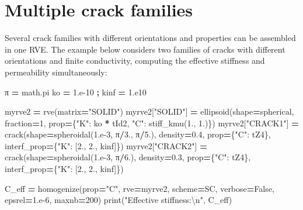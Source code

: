 \documentclass[
  a4paper,
  numbers=noendperiod,
  DIV=12]{scrreprt}
\newenvironment{Shaded}{\begin{snugshade}}{\end{snugshade}}
\newcommand{\BuiltInTok}[1]{#1}
\newcommand{\CharTok}[1]{\textcolor[rgb]{0.31,0.60,0.02}{#1}}
\newcommand{\DecValTok}[1]{\textcolor[rgb]{0.00,0.00,0.81}{#1}}
\newcommand{\FloatTok}[1]{\textcolor[rgb]{0.00,0.00,0.81}{#1}}
\newcommand{\NormalTok}[1]{#1}
\newcommand{\OperatorTok}[1]{\textcolor[rgb]{0.81,0.36,0.00}{\textbf{#1}}}
\newcommand{\StringTok}[1]{\textcolor[rgb]{0.31,0.60,0.02}{#1}}
\newcommand{\VariableTok}[1]{\textcolor[rgb]{0.00,0.00,0.00}{#1}}
\begin{document}
\section{Multiple crack families}\label{multiple-crack-families}

Several crack families with different orientations and properties can be
assembled in one RVE. The example below considers two families of cracks
with different orientations and finite conductivity, computing the
effective stiffness and permeability simultaneously:

\begin{Shaded}
\begin{Highlighting}[]
\NormalTok{π }\OperatorTok{=}\NormalTok{ math.pi}
\NormalTok{ko }\OperatorTok{=} \FloatTok{1.e{-}10} \OperatorTok{;}\NormalTok{ kinf }\OperatorTok{=} \FloatTok{1.e10}

\NormalTok{myrve2 }\OperatorTok{=}\NormalTok{ rve(matrix}\OperatorTok{=}\StringTok{"SOLID"}\NormalTok{)}
\NormalTok{myrve2[}\StringTok{"SOLID"}\NormalTok{] }\OperatorTok{=}\NormalTok{ ellipsoid(shape}\OperatorTok{=}\NormalTok{spherical, fraction}\OperatorTok{=}\DecValTok{1}\NormalTok{,}
\NormalTok{    prop}\OperatorTok{=}\NormalTok{\{}\StringTok{"K"}\NormalTok{: ko }\OperatorTok{*}\NormalTok{ tId2, }\StringTok{"C"}\NormalTok{: stiff\_kmu(}\FloatTok{1.}\NormalTok{, }\FloatTok{1.}\NormalTok{)\})}
\NormalTok{myrve2[}\StringTok{"CRACK1"}\NormalTok{] }\OperatorTok{=}\NormalTok{ crack(shape}\OperatorTok{=}\NormalTok{spheroidal(}\FloatTok{1.e{-}3}\NormalTok{, π}\OperatorTok{/}\FloatTok{3.}\NormalTok{, π}\OperatorTok{/}\FloatTok{5.}\NormalTok{), density}\OperatorTok{=}\FloatTok{0.4}\NormalTok{,}
\NormalTok{    prop}\OperatorTok{=}\NormalTok{\{}\StringTok{"C"}\NormalTok{: tZ4\}, interf\_prop}\OperatorTok{=}\NormalTok{\{}\StringTok{"K"}\NormalTok{: [}\FloatTok{2.}\NormalTok{, }\FloatTok{2.}\NormalTok{, kinf]\})}
\NormalTok{myrve2[}\StringTok{"CRACK2"}\NormalTok{] }\OperatorTok{=}\NormalTok{ crack(shape}\OperatorTok{=}\NormalTok{spheroidal(}\FloatTok{1.e{-}3}\NormalTok{, π}\OperatorTok{/}\FloatTok{6.}\NormalTok{), density}\OperatorTok{=}\FloatTok{0.3}\NormalTok{,}
\NormalTok{    prop}\OperatorTok{=}\NormalTok{\{}\StringTok{"C"}\NormalTok{: tZ4\}, interf\_prop}\OperatorTok{=}\NormalTok{\{}\StringTok{"K"}\NormalTok{: [}\FloatTok{2.}\NormalTok{, }\FloatTok{2.}\NormalTok{, kinf]\})}

\NormalTok{C\_eff }\OperatorTok{=}\NormalTok{ homogenize(prop}\OperatorTok{=}\StringTok{"C"}\NormalTok{, rve}\OperatorTok{=}\NormalTok{myrve2, scheme}\OperatorTok{=}\NormalTok{SC,}
\NormalTok{                   verbose}\OperatorTok{=}\VariableTok{False}\NormalTok{, epsrel}\OperatorTok{=}\FloatTok{1.e{-}6}\NormalTok{, maxnb}\OperatorTok{=}\DecValTok{200}\NormalTok{)}
\BuiltInTok{print}\NormalTok{(}\StringTok{"Effective stiffness:}\CharTok{\textbackslash{}n}\StringTok{"}\NormalTok{, C\_eff)}


\end{Highlighting}
\end{Shaded}
\end{document}

